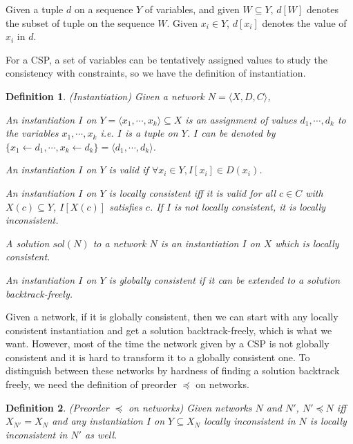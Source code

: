 \documentclass[a4paper, 12pt]{report}
\newtheorem{definition}{Definition}[subsection]
\begin{document}
            Given a tuple $d$ on a sequence $Y$ of variables, and given $W\subseteq Y$, $d[W]$ denotes the subset of tuple on the sequence $W$. Given $x_i\in Y$, $d[x_i]$ denotes the value of $x_i$ in $d$.

            For a CSP, a set of variables can be tentatively assigned values to study the consistency with constraints, so we have the definition of instantiation\cite{rossi2006handbook}.
            \begin{definition}
                (Instantiation) Given a network $N=\langle X,D,C\rangle$,

                An instantiation $I$ on $Y=\langle x_1,\cdots,x_k\rangle \subseteq X$ is an assignment of values $d_1,\cdots, d_k$ to the variables $x_1, \cdots, x_k$ i.e. $I$ is a tuple on $Y$. $I$ can be denoted by $\{x_1\leftarrow d_1, \cdots, x_k\leftarrow d_k\}=\langle d_1, \cdots, d_k\rangle$.

                An instantiation $I$ on $Y$ is valid if $\forall x_i\in Y, I[x_i]\in D(x_i)$.

                An instantiation $I$ on $Y$ is locally consistent iff it is valid for all $c\in C$ with $X(c)\subseteq Y$, $I[X(c)]$ satisfies $c$. If $I$ is not locally consistent, it is locally inconsistent.

                A solution $sol(N)$ to a network $N$ is an instantiation $I$ on $X$ which is locally consistent. 

                An instantiation $I$ on $Y$ is globally consistent if it can be extended to a solution backtrack-freely.
            \end{definition}

            Given a network, if it is globally consistent, then we can start with any locally consistent instantiation and get a solution backtrack-freely, which is what we want. However, most of the time the network given by a CSP is not globally consistent and it is hard to transform it to a globally consistent one. To distinguish between these networks by hardness of finding a solution backtrack freely, we need the definition of preorder $\preceq$ on networks.

            \begin{definition}
                (Preorder $\preceq$ on networks\cite{rossi2006handbook}) Given networks $N$ and $N'$, $N'\preceq N$ iff $X_{N'}=X_N$ and any instantiation $I$ on $Y\subseteq X_N$ locally inconsistent in $N$ is locally inconsistent in $N'$ as well.
            \end{definition}
\end{document}
